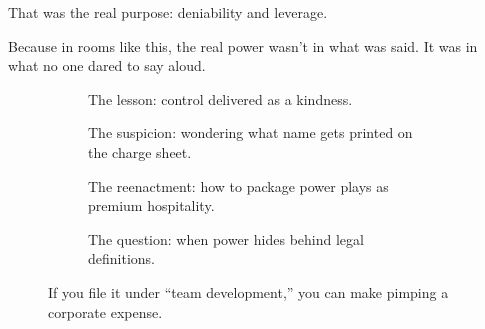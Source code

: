 That was the real purpose: deniability and leverage.

Because in rooms like this, the real power wasn’t in what was said.  It was in what no one dared to say aloud.

\medskip

\begin{figure}[H]
  \centering

  \begin{subfigure}[t]{0.45\textwidth}
  \centering
  \caption*{The lesson: control delivered as a kindness.}
  \end{subfigure}
  \hfill
  \begin{subfigure}[t]{0.45\textwidth}
  \centering
  \caption*{The suspicion: wondering what name gets printed on the charge sheet.}
  \end{subfigure}

  \vspace{1em}

  \begin{subfigure}[t]{0.45\textwidth}
  \centering
  \caption*{The reenactment: how to package power plays as premium hospitality.}
  \end{subfigure}
  \hfill
  \begin{subfigure}[t]{0.45\textwidth}
  \centering
  \caption*{The question: when power hides behind legal definitions.}
  \end{subfigure}

  \caption*{If you file it under ``team development,'' you can make pimping a corporate expense.}
\end{figure}

